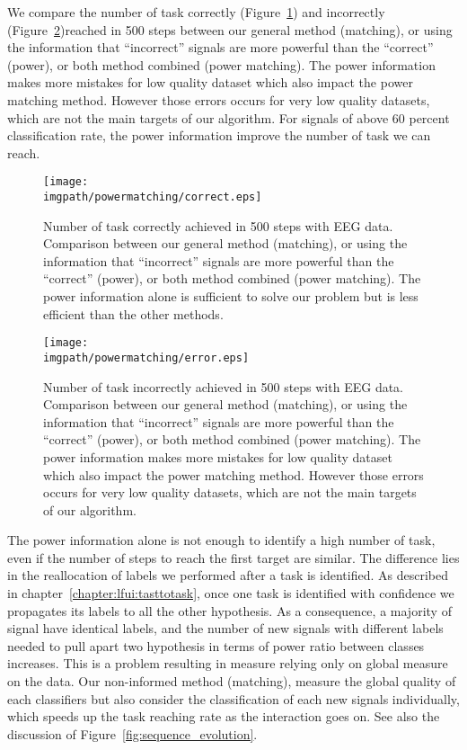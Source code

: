 We compare the number of task correctly (Figure~\ref{fig:nCorrect_powermatching}) and incorrectly (Figure~\ref{fig:nWrongEEG_powermatching})reached in 500 steps between our general method (matching), or using the information that ``incorrect'' signals are more powerful than the ``correct'' (power), or both method combined (power matching). The power information makes more mistakes for low quality dataset which also impact the power matching method. However those errors occurs for very low quality datasets, which are not the main targets of our algorithm. For signals of above 60 percent classification rate, the power information improve the number of task we can reach. 

\begin{figure}[!htbp]
\centering
\texttt{[image: \\imgpath/powermatching/correct.eps]}
\caption{Number of task correctly achieved in 500 steps with EEG data. Comparison between our general method (matching), or using the information that ``incorrect'' signals are more powerful than the ``correct'' (power), or both method combined (power matching). The power information alone is sufficient to solve our problem but is less efficient than the other methods.}
\label{fig:nCorrect_powermatching}
\end{figure} 

\begin{figure}[!htbp]
\centering
\texttt{[image: \\imgpath/powermatching/error.eps]}
\caption{Number of task incorrectly achieved in 500 steps with EEG data. Comparison between our general method (matching), or using the information that ``incorrect'' signals are more powerful than the ``correct'' (power), or both method combined (power matching). The power information makes more mistakes for low quality dataset which also impact the power matching method. However those errors occurs for very low quality datasets, which are not the main targets of our algorithm.}
\label{fig:nWrongEEG_powermatching}
\end{figure} 


The power information alone is not enough to identify a high number of task, even if the number of steps to reach the first target are similar. The difference lies in the reallocation of labels we performed after a task is identified. As described in chapter~\ref{chapter:lfui:tasttotask}, once one task is identified with confidence we propagates its labels to all the other hypothesis. As a consequence, a majority of signal have identical labels, and the number of new signals with different labels needed to pull apart two hypothesis in terms of power ratio between classes increases. This is a problem resulting in measure relying only on global measure on the data. Our non-informed method (matching), measure the global quality of each classifiers but also consider the classification of each new signals individually, which speeds up the task reaching rate as the interaction goes on. See also the discussion of Figure~\ref{fig:sequence_evolution}.


